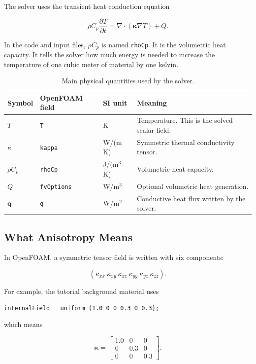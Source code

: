 \documentclass[11pt,a4paper]{article}
\newcommand{\code}[1]{\texttt{#1}}
\newcommand{\ddt}[1]{\frac{\partial #1}{\partial t}}
\newcommand{\grad}{\nabla}
\newcommand{\divergence}{\nabla \cdot}
\newcommand{\kappatensor}{\boldsymbol{\kappa}}
\begin{document}
The solver uses the transient heat conduction equation

\[
\rho C_p \ddt{T} = \divergence \left(\kappatensor \grad T\right) + Q.
\]

In the code and input files, $\rho C_p$ is named \code{rhoCp}. It is the
volumetric heat capacity. It tells the solver how much energy is needed to
increase the temperature of one cubic meter of material by one kelvin.

\begin{table}[h]
\centering
\begin{tabularx}{\textwidth}{l l l Y}
\toprule
Symbol & OpenFOAM field & SI unit & Meaning \\
\midrule
$T$ & \code{T} & K & Temperature. This is the solved scalar field. \\
$\kappa$ & \code{kappa} & W/(m K) & Symmetric thermal conductivity tensor. \\
$\rho C_p$ & \code{rhoCp} & J/(m$^3$ K) & Volumetric heat capacity. \\
$Q$ & \code{fvOptions} & W/m$^3$ & Optional volumetric heat generation. \\
$\boldsymbol{q}$ & \code{q} & W/m$^2$ & Conductive heat flux written by the solver. \\
\bottomrule
\end{tabularx}
\caption{Main physical quantities used by the solver.}
\label{tab:physical-quantities}
\end{table}

\subsection{What Anisotropy Means}

In OpenFOAM, a symmetric tensor field is written with six components:

\[
(\kappa_{xx}\ \kappa_{xy}\ \kappa_{xz}\ \kappa_{yy}\ \kappa_{yz}\ \kappa_{zz}).
\]

For example, the tutorial background material uses

\begin{lstlisting}
internalField   uniform (1.0 0 0 0.3 0 0.3);
\end{lstlisting}

which means

\[
\kappatensor =
\begin{bmatrix}
1.0 & 0 & 0 \\
0 & 0.3 & 0 \\
0 & 0 & 0.3
\end{bmatrix}.
\]
\end{document}

